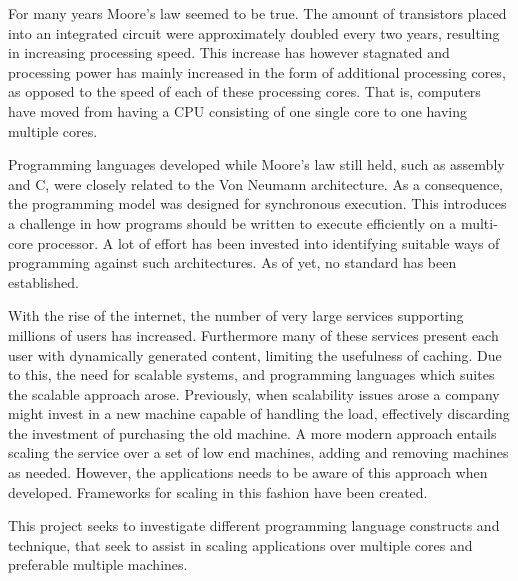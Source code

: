 \makeatletter {}\makeatother
{}
For many years Moore's law\cite{moore1965cramming} seemed to be true. The amount of transistors placed into an integrated circuit were approximately doubled every two years, resulting in increasing processing speed. This increase has however stagnated and processing power has mainly increased in the form of additional processing cores, as opposed to the speed of each of these processing cores\cite[p. 22]{sevenModels}. That is, computers have moved from having a \ac{CPU} consisting of one single core to one having multiple cores. 

Programming languages developed while Moore's law still held, such as assembly and C, were closely related to the Von Neumann architecture. As a consequence, the programming model was designed for synchronous execution. This introduces a challenge in how programs should be written to execute efficiently on a multi-core processor. A lot of effort has been invested into identifying suitable ways of programming against such architectures. As of yet, no standard has been established. 

With the rise of the internet, the number of very large services supporting millions of users has increased. Furthermore many of these services present each user with dynamically generated content, limiting the usefulness of caching. Due to this, the need for scalable systems, and programming languages which suites the scalable approach arose. Previously, when scalability issues arose a company might invest in a new machine capable of handling the load, effectively discarding the investment of purchasing the old machine\cite[p. 2]{haller2007actors}. A more modern approach entails scaling the service over a set of low end machines, adding and removing machines as needed. However, the applications needs to be aware of this approach when developed. Frameworks for scaling in this fashion have been created\cite{haller2007actors}\cite{krohn2004building}.


This project seeks to investigate different programming language constructs and technique, that seek to assist in scaling applications over multiple cores and preferable multiple machines.



 
\worksheetend
